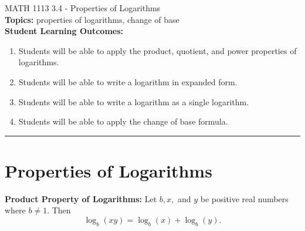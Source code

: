 \documentclass[11pt]{article}
\begin{document}
\noindent MATH 1113   \hfill 3.4 - Properties of Logarithms\\



\noindent \textbf{Topics:}  properties of logarithms, change of base\\

\noindent \textbf{Student Learning Outcomes:}
\begin{enumerate}
\item Students will be able to apply the product, quotient, and power properties of logarithms.
\item Students will be able to write a logarithm in expanded form.
\item Students will be able to write a logarithm as a single logarithm.
\item Students will be able to apply the change of base formula.
\end{enumerate}

\hrule 
\vspace{5mm}
\section{Properties of Logarithms}


\noindent \textbf{Product Property of Logarithms:} Let $b, x,$ and $y$ be positive real numbers where $b \neq 1.$  Then $$\log_b (xy)=\log_b (x) + \log_b(y).$$   
\end{document}
